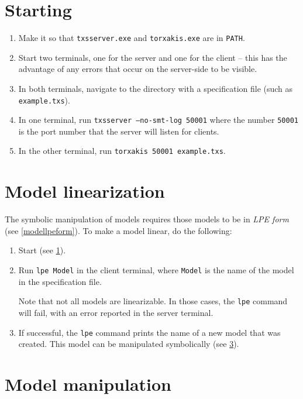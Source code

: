 \section{Starting \txs{}} \label{starttxs}

\begin{enumerate}
\item Make it so that \texttt{txsserver.exe} and \texttt{torxakis.exe} are in \texttt{PATH}.
\item Start two terminals, one for the \txs{} server and one for the \txs{} client -- this has the advantage of any errors that occur on the server-side to be visible.
\item In both terminals, navigate to the directory with a \txs{} specification file (such as \texttt{example.txs}).
\item In one terminal, run \texttt{txsserver --no-smt-log 50001} where the number \texttt{50001} is the port number that the \txs{} server will listen for clients.
\item In the other terminal, run \texttt{torxakis 50001 example.txs}.
\end{enumerate}

\section{Model linearization} \label{modellinearization}

The symbolic manipulation of \txs{} models requires those models to be in \emph{LPE form} (see \ref{modellpeform}).
To make a \txs{} model linear, do the following:

\begin{enumerate}
\item Start \txs{} (see \ref{starttxs}).
\item Run \texttt{lpe Model} in the client terminal, where \texttt{Model} is the name of the model in the \txs{} specification file.

Note that not all \txs{} models are linearizable.
In those cases, the \texttt{lpe} command will fail, with an error reported in the server terminal.
\item If successful, the \texttt{lpe} command prints the name of a new \txs{} model that was created.
This model can be manipulated symbolically (see \ref{modelmanipulation}).
\end{enumerate}

\section{Model manipulation} \label{modelmanipulation}


